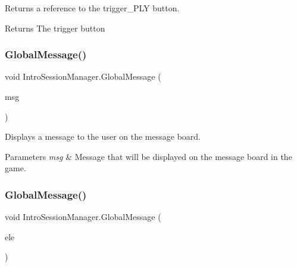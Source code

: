 Returns a reference to the {\ttfamily trigger\+\_\+\+P\+LY} button. 

\begin{DoxyReturn}{Returns}
The trigger button
\end{DoxyReturn}
\mbox{\label{class_intro_session_manager_a8e0deb467e6dbfcc9074221bfba81053}} 
\subsubsection{\texorpdfstring{Global\+Message()}{GlobalMessage()}\hspace{0.1cm}{\footnotesize\ttfamily [1/2]}}
{\footnotesize\ttfamily void Intro\+Session\+Manager.\+Global\+Message (\begin{DoxyParamCaption}\item[{string}]{msg }\end{DoxyParamCaption})}



Displays a message to the user on the message board. 


\begin{DoxyParams}{Parameters}
{\em msg} & Message that will be displayed on the message board in the game.\\
\hline
\end{DoxyParams}
\mbox{\label{class_intro_session_manager_a97e1107140022bb06bfef6e4054ae69c}} 
\subsubsection{\texorpdfstring{Global\+Message()}{GlobalMessage()}\hspace{0.1cm}{\footnotesize\ttfamily [2/2]}}
{\footnotesize\ttfamily void Intro\+Session\+Manager.\+Global\+Message (\begin{DoxyParamCaption}\item[{\mbox{\hyperlink{class_dialogue_element}{Dialogue\+Element}}}]{ele }\end{DoxyParamCaption})}



